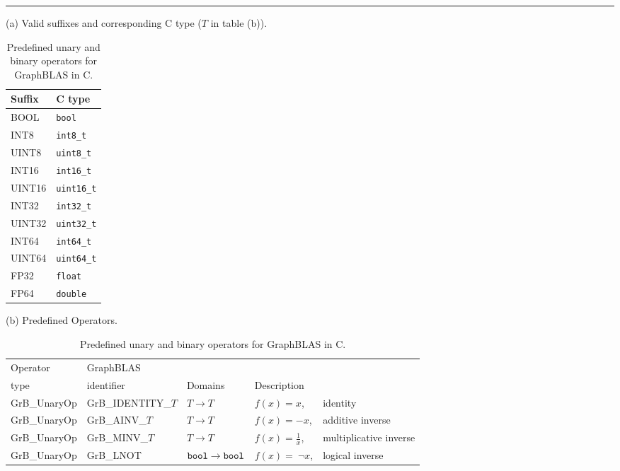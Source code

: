 \begin{table}
\hrule
\begin{center}
\caption{Predefined unary and binary operators for GraphBLAS in C.}
\label{Tab:PredefinedOperators}

\vspace{1\baselineskip}
(a) Valid suffixes and corresponding C type ($T$ in table (b)).
\vspace{1\baselineskip}

\begin{tabular}{l|l}
Suffix			& C type \\ \hline
{\sf BOOL}		& {\tt bool} \\
{\sf INT8}		& {\tt int8\_t} \\
{\sf UINT8}		& {\tt uint8\_t} \\
{\sf INT16}		& {\tt int16\_t} \\
{\sf UINT16}	& {\tt uint16\_t} \\
{\sf INT32}		& {\tt int32\_t} \\
{\sf UINT32}	& {\tt uint32\_t} \\
{\sf INT64}		& {\tt int64\_t} \\
{\sf UINT64}	& {\tt uint64\_t} \\
{\sf FP32}		& {\tt float} \\
{\sf FP64}		& {\tt double} \\
\end{tabular}

\vspace{1\baselineskip}
(b) Predefined Operators.
\vspace{1\baselineskip}

\begin{tabular}{l|l|l|ll}
Operator & GraphBLAS             &                                                              & \\
type     & identifier            & Domains                                              & Description \\ \hline
{\sf GrB\_UnaryOp}    & {\sf GrB\_IDENTITY\_$T$} & $T \rightarrow T $     & $f(x) = x$, &identity \\
{\sf GrB\_UnaryOp}    & {\sf GrB\_AINV\_$T$}     & $T \rightarrow T $     & $f(x) = -x$, &additive inverse \\
{\sf GrB\_UnaryOp}    & {\sf GrB\_MINV\_$T$}     & $T \rightarrow T $     & $f(x) = \frac{1}{x}$, &multiplicative inverse \\
{\sf GrB\_UnaryOp}    & {\sf GrB\_LNOT}          & ${\tt bool} \rightarrow {\tt bool}$  & $f(x) =~\neg x$, &logical inverse  \\


\end{tabular}
\end{center}
\end{table}
